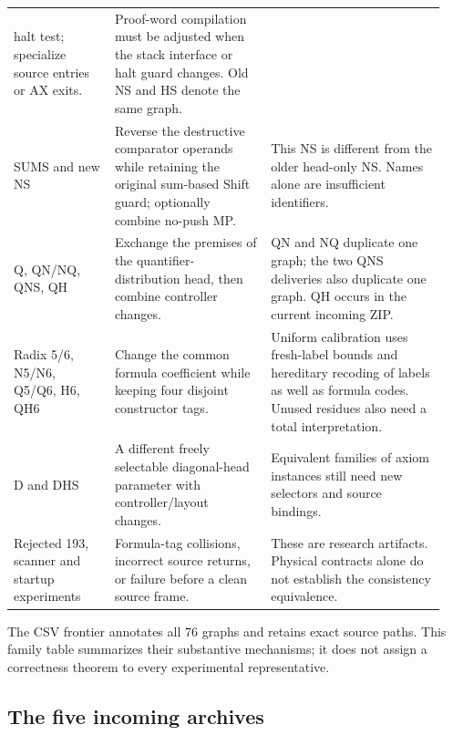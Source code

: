 \documentclass[11pt,letterpaper]{article}
\begin{document}
\begin{longtable}{@{}>{\raggedright\arraybackslash}p{0.22\linewidth}>{\raggedright\arraybackslash}p{0.34\linewidth}>{\raggedright\arraybackslash}p{0.38\linewidth}@{}}
halt test; specialize source entries or AX exits. & Proof-word compilation must
be adjusted when the stack interface or halt guard changes. Old NS and HS denote
the same graph.\\
SUMS and new NS & Reverse the destructive comparator operands while retaining
the original sum-based Shift guard; optionally combine no-push MP. & This NS is
different from the older head-only NS. Names alone are insufficient identifiers.\\
Q, QN/NQ, QNS, QH & Exchange the premises of the quantifier-distribution head,
then combine controller changes. & QN and NQ duplicate one graph; the two QNS
deliveries also duplicate one graph. QH occurs in the current incoming ZIP.\\
Radix 5/6, N5/N6, Q5/Q6, H6, QH6 & Change the common formula coefficient while
keeping four disjoint constructor tags. & Uniform calibration uses fresh-label
bounds and hereditary recoding of labels as well as formula codes. Unused
residues also need a total interpretation.\\
D and DHS & A different freely selectable diagonal-head parameter with
controller/layout changes. & Equivalent families of axiom instances still need
new selectors and source bindings.\\
Rejected 193, scanner and startup experiments & Formula-tag collisions,
incorrect source returns, or failure before a clean source frame. & These are
research artifacts. Physical contracts alone do not establish the consistency
equivalence.\\
\bottomrule
\end{longtable}

The CSV frontier annotates all 76 graphs and retains exact source paths. This
family table summarizes their substantive mechanisms; it does not assign a
correctness theorem to every experimental representative.

\subsection{The five incoming archives}
\end{document}

